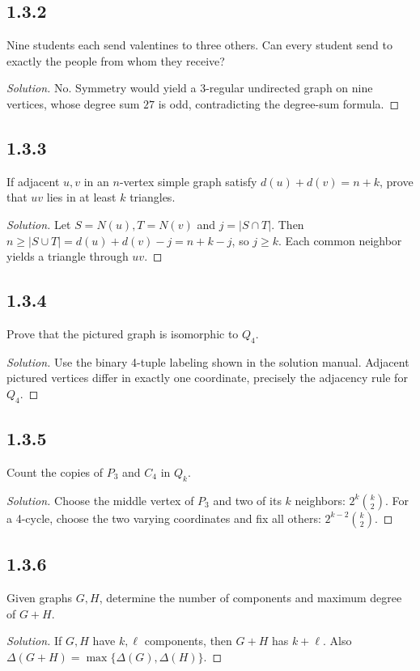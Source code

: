 \documentclass[12pt]{amsart}
\newenvironment{solution}{\begin{proof}[Solution]}{\end{proof}}
\begin{document}
    \subsection*{1.3.2} Nine students each send valentines to three others. Can every student send to exactly the people from whom they receive?
    \begin{solution}No. Symmetry would yield a 3-regular undirected graph on nine vertices, whose degree sum $27$ is odd, contradicting the degree-sum formula.\end{solution}
    \subsection*{1.3.3} If adjacent $u,v$ in an $n$-vertex simple graph satisfy $d(u)+d(v)=n+k$, prove that $uv$ lies in at least $k$ triangles.
    \begin{solution}Let $S=N(u),T=N(v)$ and $j=|S\cap T|$. Then
        $n\ge |S\cup T|=d(u)+d(v)-j=n+k-j$, so $j\ge k$. Each common neighbor yields a triangle through $uv$.\end{solution}
    \subsection*{1.3.4} Prove that the pictured graph is isomorphic to $Q_4$.
    \begin{solution}Use the binary 4-tuple labeling shown in the solution manual. Adjacent pictured vertices differ in exactly one coordinate, precisely the adjacency rule for $Q_4$.\end{solution}
    \subsection*{1.3.5} Count the copies of $P_3$ and $C_4$ in $Q_k$.
    \begin{solution}Choose the middle vertex of $P_3$ and two of its $k$ neighbors: $2^k\binom{k}{2}$. For a 4-cycle, choose the two varying coordinates and fix all others: $2^{k-2}\binom{k}{2}$.\end{solution}
    \subsection*{1.3.6} Given graphs $G,H$, determine the number of components and maximum degree of $G+H$.
    \begin{solution}If $G,H$ have $k,\ell$ components, then $G+H$ has $k+\ell$. Also $\Delta(G+H)=\max\{\Delta(G),\Delta(H)\}$.\end{solution}
\end{document}
